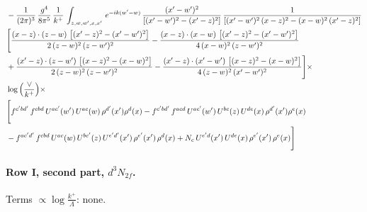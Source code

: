 \documentclass[10pt]{article}
\numberwithin{equation}{section}
\begin{document}
\begin{align}
& -\frac{1}{(2\pi)^{3}}\, \frac{g^{4}}{8\pi^{5}}\,\frac{1}{k^{+}}\,\int_{z,w,w^{\prime},x,x'}\, e^{-ik(w^{\prime}-w)}\, \frac{(x'-w')^{2}}{\left[(x'-w')^{2}-(x'-z)^{2}\right]}\, \frac{1}{\left[(x'-w')^{2}\, (x-z)^{2} - (x-w)^{2}\, (x'-z)^{2}\right]}  \notag \\ & \Bigg[\frac{(x-z)\cdot (z-w)\, \left[(x'-z)^{2}-(x'-w')^{2}\right]}{2\, (z-w)^{2}\, (z-w')^{2}}  - \frac{(x-z)\cdot (x-w)\,\left[(x'-z)^{2}-(x'-w')^{2}\right] }{4\,(x-w)^{2}\,(z-w')^{2}}\notag \\ & +\frac{(x'-z)\cdot (z-w')\, \left[(x-z)^{2}-(x-w)^{2}\right]}{2\, (z-w)^{2}\, (z-w')^{2}}-\frac{(x'-z)\cdot (x'-w')\, \left[(x-z)^{2}-(x-w)^{2}\right]}{4\, (z-w)^{2}\,(x'-w')^{2}}\Bigg]\times\,\notag \\ & \log{\left(\frac{\vee}{k^{+}}\right)}\times\notag \\ & \Bigg[f^{c'bd'}\,f^{cbd}\, U^{ac'}(w')\,U^{ac}(w)\,\rho^{d'}(x')\rho^{d}(x)- f^{c'bd'}\,f^{acd}\,U^{ac'}(w')\,U^{bc}(z)\,U^{de}(x)\,\rho^{d'}(x')\rho^{e}(x) \notag \\ & -f^{ac'd'}\,f^{cbd}\,U^{ac}(w)\,U^{bc'}(z)\,U^{e'd'}(x')\,\rho^{e'}(x')\,\rho^{d}(x) +N_{c}\,U^{e'd}(x')\,U^{de}(x)\,\rho^{e'}(x')\,\rho^{e}(x)\Bigg] \label{eq:B:G2I2e}
\end{align}

\paragraph{Row I, second part, $d^3N_{2f}$.}
\noindent Terms $\propto\log\frac{k^+}{\Lambda}$: none.
\end{document}
